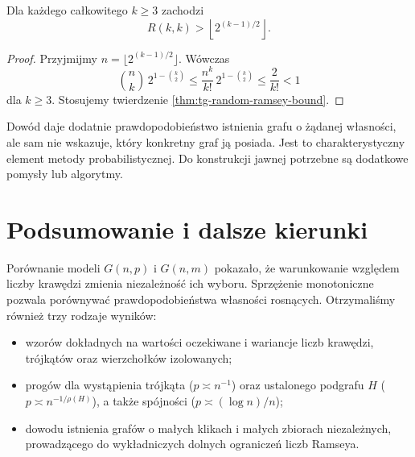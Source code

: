 \begin{wniosek}
\label{cor:tg-random-ramsey-exponential}
Dla każdego
całkowitego $k\geq3$
zachodzi
\[
R(k,k)>
\left\lfloor2^{(k-1)/2}\right\rfloor.
\]
\end{wniosek}
\begin{proof}
Przyjmijmy
$n=\lfloor2^{(k-1)/2}\rfloor$.
Wówczas
\[
\binom nk\,2^{1-\binom k2}
\leq\frac{n^k}{k!}
\,2^{1-\binom k2}
\leq\frac2{k!}<1
\]
dla $k\geq3$.
Stosujemy twierdzenie
\ref{thm:tg-random-ramsey-bound}.
\end{proof}

\begin{uwaga}
Dowód daje dodatnie
prawdopodobieństwo
istnienia grafu
o żądanej własności,
ale sam nie wskazuje,
który konkretny
graf ją posiada.
Jest to charakterystyczny
element metody
probabilistycznej.
Do konstrukcji jawnej
potrzebne są dodatkowe
pomysły lub algorytmy.
\end{uwaga}

\section{Podsumowanie i dalsze kierunki}
\label{sec:tg-random-summary}

Porównanie modeli $G(n,p)$ i $G(n,m)$ pokazało,
że warunkowanie względem liczby krawędzi zmienia
niezależność ich wyboru. Sprzężenie monotoniczne
pozwala porównywać prawdopodobieństwa własności
rosnących. Otrzymaliśmy również trzy rodzaje wyników:
\begin{itemize}[leftmargin=2em,itemsep=3pt]
\item wzorów dokładnych
na wartości oczekiwane
i wariancje
liczb krawędzi,
trójkątów oraz
wierzchołków izolowanych;
\item progów
dla wystąpienia
trójkąta
($p\asymp n^{-1}$)
oraz ustalonego podgrafu $H$
($p\asymp n^{-1/\rho(H)}$), a także spójności
($p\asymp(\log n)/n$);
\item dowodu
istnienia
grafów o małych
klikach i małych
zbiorach niezależnych,
prowadzącego do
wykładniczych
dolnych ograniczeń
liczb Ramseya.
\end{itemize}
